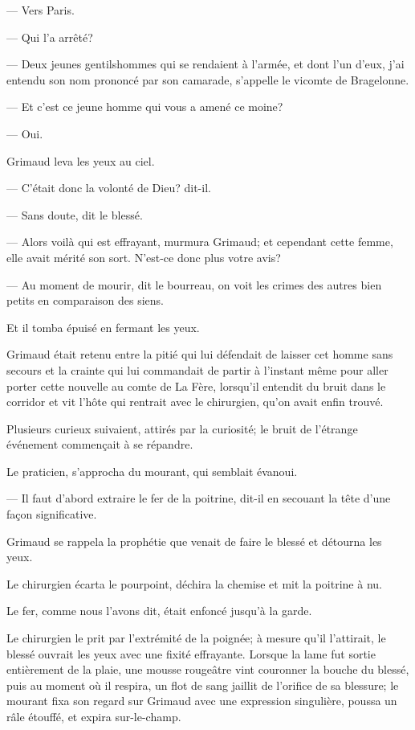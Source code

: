 — Vers Paris.

— Qui l'a arrêté?

— Deux jeunes gentilshommes qui se rendaient à l'armée, et dont l'un d'eux, j'ai entendu son nom prononcé par son camarade, s'appelle le vicomte de Bragelonne.

— Et c'est ce jeune homme qui vous a amené ce moine?

— Oui.

Grimaud leva les yeux au ciel.

— C'était donc la volonté de Dieu? dit-il.

— Sans doute, dit le blessé.

— Alors voilà qui est effrayant, murmura Grimaud; et cependant cette femme, elle avait mérité son sort. N'est-ce donc plus votre avis?

— Au moment de mourir, dit le bourreau, on voit les crimes des autres bien petits en comparaison des siens.

Et il tomba épuisé en fermant les yeux.

Grimaud était retenu entre la pitié qui lui défendait de laisser cet homme sans secours et la crainte qui lui commandait de partir à l'instant même pour aller porter cette nouvelle au comte de La Fère, lorsqu'il entendit du bruit dans le corridor et vit l'hôte qui rentrait avec le chirurgien, qu'on avait enfin trouvé.

Plusieurs curieux suivaient, attirés par la curiosité; le bruit de l'étrange événement commençait à se répandre.

Le praticien, s'approcha du mourant, qui semblait évanoui.

— Il faut d'abord extraire le fer de la poitrine, dit-il en secouant la tête d'une façon significative.

Grimaud se rappela la prophétie que venait de faire le blessé et détourna les yeux.

Le chirurgien écarta le pourpoint, déchira la chemise et mit la poitrine à nu.

Le fer, comme nous l'avons dit, était enfoncé jusqu'à la garde.

Le chirurgien le prit par l'extrémité de la poignée; à mesure qu'il l'attirait, le blessé ouvrait les yeux avec une fixité effrayante. Lorsque la lame fut sortie entièrement de la plaie, une mousse rougeâtre vint couronner la bouche du blessé, puis au moment où il respira, un flot de sang jaillit de l'orifice de sa blessure; le mourant fixa son regard sur Grimaud avec une expression singulière, poussa un râle étouffé, et expira sur-le-champ.

